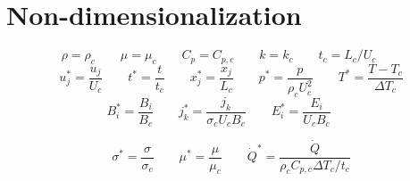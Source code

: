 \documentclass[11pt]{article}
\begin{document}
\section{Non-dimensionalization}
\begin{equation}
	\rho = \rho_c \qquad
	\mu = \mu_c \qquad
	C_p = C_{p,c} \qquad
	k = k_c \qquad
	t_c = L_c/U_c \qquad
\end{equation}
\begin{equation}
	u_j^* = \frac{u_j}{U_c} \qquad
	t^* = \frac{t}{t_c} \qquad
	x_j^* = \frac{x_j}{L_c} \qquad
	p^* = \frac{p}{\rho_c U_c^2} \qquad
	T^* = \frac{T - T_c}{\Delta T_c}
\end{equation}
\begin{equation}
	B_i^* = \frac{B_i}{B_c}  \qquad
	j_k^* = \frac{j_k}{\sigma_c U_c B_c} \qquad
	E_i^* = \frac{E_i}{U_c B_c} \qquad
\end{equation}

\begin{equation}
	\sigma^* = \frac{\sigma}{\sigma_c} \qquad
	\mu^* = \frac{\mu}{\mu_c} \qquad
	\dot{Q}^* = \frac{\dot{Q}}{\rho_c C_{p,c} \Delta T_c / t_c}
\end{equation}
\end{document}
